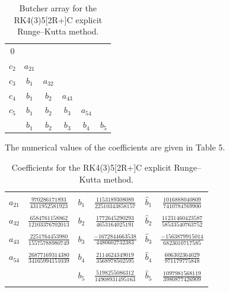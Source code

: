 \documentclass[dvips]{article}
\begin{document}
\begin{table}[htbp]
\begin{center}
\begin{tabular}{c|ccccc}
0 &  &  &  &  &  \\
$c_{2}$ & $a_{21}$ &  &  &  &  \\
$c_{3}$ & $b_{1}$ & $a_{32}$  &  &  &  \\
$c_{4}$ & $b_{1}$ & $b_{2}$ & $a_{43}$  &  &  \\
$c_{5}$ & $b_{1}$ & $b_{2}$ & $b_{3}$ &  $a_{54}$  &  \\ \hline
        & $b_{1}$ & $b_{2}$ & $b_{3}$ &  $b_{4}$   &  $b_{5}$
\end{tabular}
\caption{Butcher array for the RK4(3)5[2R+]C explicit Runge--Kutta method.}
\end{center}
\end{table}

The numerical values of the coefficients are given in Table 5.

\begin{table}[htbp]
\begin{center}
\begin{tabular}{|c|c|c|c|c|c|} \hline
  &  &  &  &  & \\
$a_{21}$ & $\frac{970286171893}{4311952581923}$ &
$b_{1}$  & $\frac{1153189308089}{22510343858157}$ &
$\hat{b}_{1}$ & $\frac{1016888040809}{7410784769900}$ \\
  &  &  &  &  & \\
$a_{32}$ & $\frac{6584761158862}{12103376702013}$ &
$b_{2}$  & $\frac{1772645290293}{4653164025191}$ & 
$\hat{b}_{2}$ & $\frac{11231460423587}{58533540763752}$ \\
  &  &  &  &  & \\
$a_{43}$ & $\frac{2251764453980}{15575788980749}$ &
$b_{3}$ & $\frac{-1672844663538}{4480602732383}$ &
$\hat{b}_{3}$ & $\frac{-1563879915014}{6823010717585}$ \\
  &  &  &  &  & \\
$a_{54}$ & $\frac{26877169314380}{34165994151039}$ &
$b_{4}$ & $\frac{2114624349019}{3568978502595}$ &
$\hat{b}_{4}$ & $\frac{606302364029}{971179775848}$ \\
  &  &  &  &  & \\
        &   &
$b_{5}$ & $\frac{5198255086312}{14908931495163}$ &
$\hat{b}_{5}$ & $\frac{1097981568119}{3980877426909}$ \\
  &  &  &  &  & \\ \hline
\end{tabular}
\caption{Coefficients for the RK4(3)5[2R+]C explicit Runge--Kutta method.}
\end{center}
\end{table}
\end{document}
